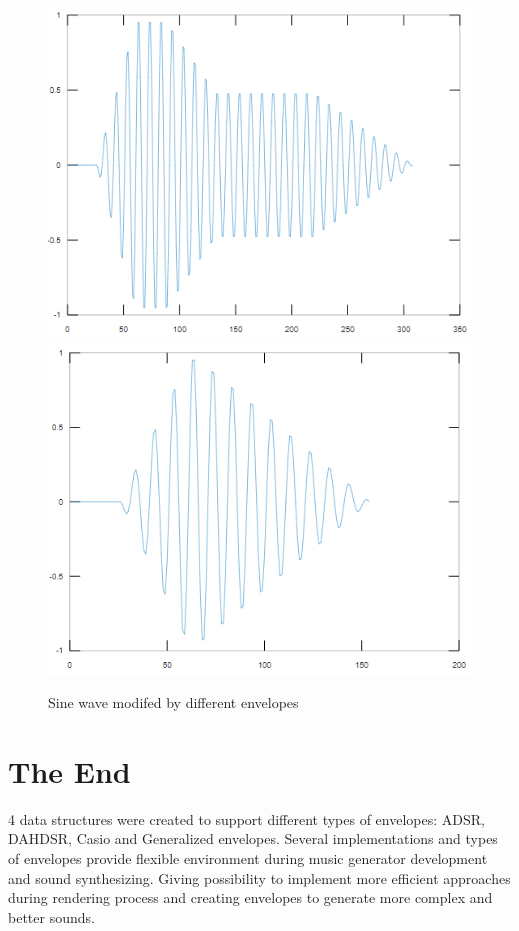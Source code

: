 \documentclass[12pt, a4paper]{article}
\begin{document}
\begin{figure}[ht!]

\center
\includegraphics[scale=0.3]{sine1}
\includegraphics[scale=0.3]{sine2}
\caption{Sine wave modifed by different envelopes}

\end{figure}

\section{The End}

4 data structures were created to support different types of envelopes: ADSR, DAHDSR, Casio and Generalized envelopes. Several implementations and types of envelopes provide flexible environment during music generator development and sound synthesizing. Giving possibility to implement more efficient approaches during rendering process and creating envelopes to generate more complex and better sounds.
\end{document}
